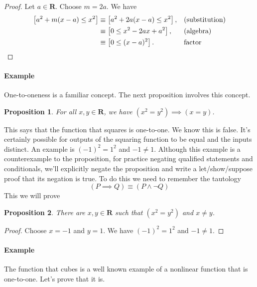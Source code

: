 \documentclass[12pt,fleqn]{article}
\newcommand{\reals}{\mathbf{R}}
\newenvironment{myproof}
  {\begin{shaded}\begin{proof}}
  {\end{proof}\end{shaded}}
\newtheorem{prop}{Proposition}
\newcounter{ex}\setcounter{ex}{0}
\newcommand{\ex}{%
\setcounter{ex}{\value{ex}+1}
\paragraph{Example \theex}}
\begin{document}
      \begin{myproof} 
      Let $a \in \reals$. Choose $m=2a$. We have
      \begin{align*}
       \left[{a^2+m(x-a) \le x^2} \right]   
       &\equiv \left[a^2+2a(x-a)\le x^2\right], &&\text{(substitution)}\\
      &\equiv \left[0 \le x^2-2ax+a^2\right], &&\text{(algebra)}\\
      &\equiv \left[0 \le (x-a)^2\right]. &&\text{factor}  \qedhere
      \end{align*}
  \end{myproof}

  \ex One-to-oneness is a familiar concept. The next proposition 
  involves this concept.

     \begin{prop} For all $x,y \in \reals$, we have $(x^2 = y^2) \implies (x=y)$. 
     \end{prop} 
    \noindent This says that the function that squares is one-to-one. We know this is false. It's certainly possible for outputs of 
    the squaring function to be equal and the inputs distinct. An example is $(-1)^2 = 1^2$ and $-1 \neq 1$. Although this example
    is a counterexample to the proposition, for  practice negating qualified statements and conditionals,  we'll explicitly negate the proposition and write a let/show/suppose  proof that its negation is true.
    To do this we need to remember the tautology
    \begin{equation*}
       \left(P \implies Q\right) \equiv \left(P \land \lnot Q\right)
 \end{equation*}
   This we will prove
    \begin{prop} There are $x,y \in \reals$ such that  $(x^2 = y^2)$ and $x\neq y$. 
     \end{prop} 
     
     \begin{myproof} Choose $x=-1$ and $y=1$. We have $(-1)^2 = 1^2$ and $-1 \neq 1$.      \end{myproof}

     \ex The function that cubes is a well known example of a nonlinear 
     function that is one-to-one. Let's prove that it is.
\end{document}
